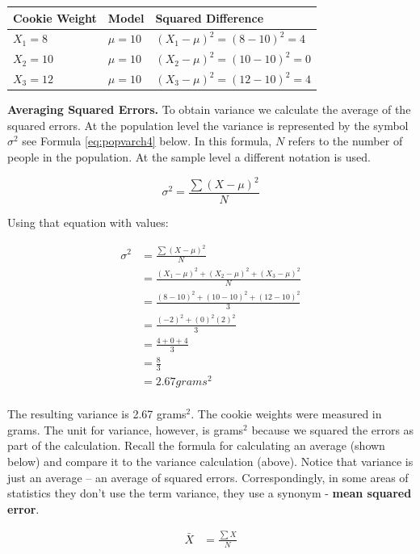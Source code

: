 \documentclass[
]{krantz}
\begin{document}
\begin{longtable}[]{@{}lll@{}}
\toprule
Cookie Weight & Model & Squared Difference \\
\midrule
\endhead
\(X_1 = 8\) & \(\mu = 10\) & \((X_1 - \mu)^2 =(8 - 10)^2= 4\) \\
\(X_2 = 10\) & \(\mu = 10\) & \((X_2 - \mu)^2 =(10 - 10)^2= 0\) \\
\(X_3 = 12\) & \(\mu = 10\) & \((X_3 - \mu)^2 =(12 - 10)^2= 4\) \\
\bottomrule
\end{longtable}

\textbf{Averaging Squared Errors.} To obtain variance we calculate the average of the squared errors. At the population level the variance is represented by the symbol \(\sigma^2\) see Formula \eqref{eq:popvarch4} below. In this formula, \(N\) refers to the number of people in the population. At the sample level a different notation is used.

\begin{equation} 
\sigma^2 = \frac{\sum{(X - \mu)^2}}{N}
      \label{eq:popvarch4}
\end{equation}

Using that equation with values:

\[
\begin{aligned} 
\sigma^2 &= \frac{\sum{(X - \mu)^2}}{N}\\
&= \frac{(X_1-\mu)^2 + (X_2-\mu)^2 + (X_3-\mu)^2}{N}  \\ 
&= \frac{(8-10)^2 + (10-10)^2 + (12-10)^2}{3}\\
&= \frac{(-2)^2 + (0)^2 (2)^2}{3} \\
&= \frac{4 + 0 + 4}{3} \\
&= \frac{8}{3} \\
&= 2.67 grams^2 \\
\end{aligned} 
\]

The resulting variance is 2.67 grams\(^2\). The cookie weights were measured in grams. The unit for variance, however, is grams\(^2\) because we squared the errors as part of the calculation. Recall the formula for calculating an average (shown below) and compare it to the variance calculation (above). Notice that variance is just an average -- an average of squared errors. Correspondingly, in some areas of statistics they don't use the term variance, they use a synonym - \textbf{mean squared error}.

\[
\begin{aligned} 
\bar{X} &= \frac{\sum{X}}{N} \\
\end{aligned} 
\]
\end{document}
